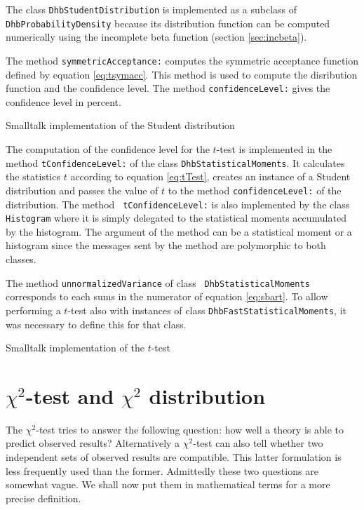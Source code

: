 \documentclass[twoside]{book}
\begin{document}
The class {\tt DhbStudentDistribution} is implemented as a
subclass of {\tt DhbProbabilityDensity} because its distribution
function can be computed numerically using the incomplete beta
function (\cf section \ref{sec:incbeta}).

The method {\tt symmetricAcceptance:} computes the symmetric
acceptance function defined by equation \ref{eq:tsymacc}. This
method is used to compute the disribution function and the
confidence level. The method {\tt confidenceLevel:} gives the
confidence level in percent.
\begin{listing} Smalltalk implementation of the Student distribution \label{ls:tdist}

\end{listing}

The computation of the confidence level for the $t$-test is
implemented in the method {\tt tConfidenceLevel:} of the class
{\tt DhbStatisticalMoments}. It calculates the statistics $t$
according to equation \ref{eq:tTest}, creates an instance of a
Student distribution and passes the value of $t$ to the method
{\tt confidenceLevel:} of the distribution. The method {\tt
tConfidenceLevel:} is also implemented by the class {\tt
Histogram} where it is simply delegated to the statistical moments
accumulated by the histogram. The argument of the method can be a
statistical moment or a histogram since the messages sent by the
method are polymorphic to both classes.

The method {\tt unnormalizedVariance} of class {\tt
DhbStatisticalMoments} corresponds to each sums in the numerator
of equation \ref{eq:sbart}. To allow performing a $t$-test also
with instances of class {\tt DhbFastStatisticalMoments}, it was
necessary to define this for that class.

\begin{listing} Smalltalk implementation of the $t$-test \label{ls:tTest}



\end{listing}

\section{$\chi^2$-test and $\chi^2$ distribution}
\label{sec:chitest} The $\chi^2$-test tries to answer the
following question: how well a theory is able to predict observed
results? Alternatively a $\chi^2$-test can also tell whether two
independent sets of observed results are compatible. This latter
formulation is less frequently used than the former. Admittedly
these two questions are somewhat vague. We shall now put them in
mathematical terms for a more precise definition.
\end{document}
